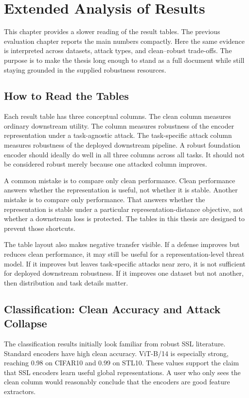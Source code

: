 \chapter{Extended Analysis of Results}
\label{chap:extended-analysis}

This chapter provides a slower reading of the result tables. The previous evaluation chapter reports the main numbers compactly. Here the same evidence is interpreted across datasets, attack types, and clean--robust trade-offs. The purpose is to make the thesis long enough to stand as a full document while still staying grounded in the supplied robustness resources.

\section{How to Read the Tables}

Each result table has three conceptual columns. The clean column measures ordinary downstream utility. The \EmbedAttack column measures robustness of the encoder representation under a task-agnostic attack. The task-specific attack column measures robustness of the deployed downstream pipeline. A robust foundation encoder should ideally do well in all three columns across all tasks. It should not be considered robust merely because one attacked column improves.

A common mistake is to compare only clean performance. Clean performance answers whether the representation is useful, not whether it is stable. Another mistake is to compare only \EmbedAttack performance. That answers whether the representation is stable under a particular representation-distance objective, not whether a downstream loss is protected. The tables in this thesis are designed to prevent those shortcuts.

The table layout also makes negative transfer visible. If a defense improves \EmbedAttack but reduces clean performance, it may still be useful for a representation-level threat model. If it improves \EmbedAttack but leaves task-specific attacks near zero, it is not sufficient for deployed downstream robustness. If it improves one dataset but not another, then distribution and task details matter.

\section{Classification: Clean Accuracy and Attack Collapse}

The classification results initially look familiar from robust SSL literature. Standard encoders have high clean accuracy. \DINOv ViT-B/14 is especially strong, reaching 0.98 on CIFAR10 and 0.99 on STL10. These values support the claim that SSL encoders learn useful global representations. A user who only sees the clean column would reasonably conclude that the encoders are good feature extractors.

